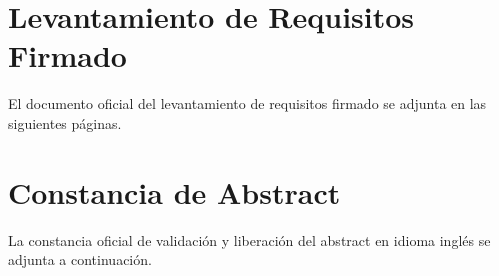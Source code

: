 \clearpage
\section{Levantamiento de Requisitos Firmado}
\label{anexo:levantamiento_requisitos}
El documento oficial del levantamiento de requisitos firmado se adjunta en las siguientes páginas.


\clearpage
\section{Constancia de Abstract}
\label{anexo:constancia_abstract}
La constancia oficial de validación y liberación del abstract en idioma inglés se adjunta a continuación.

